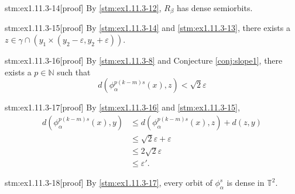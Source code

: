 \begin{stm}{stm:ex1.11.3-14}[proof]
By \ref{stm:ex1.11.3-12}, $R_\beta$ has dense semiorbits.
\end{stm}

\begin{stm}{stm:ex1.11.3-15}[proof]
By \ref{stm:ex1.11.3-14} and \ref{stm:ex1.11.3-13}, there exists a $z \in \gamma \cap (y_1 \times (y_2 - \varepsilon, y_2 + \varepsilon))$.
\end{stm}

\begin{stm}{stm:ex1.11.3-16}[proof]
By \ref{stm:ex1.11.3-8} and Conjecture \ref{conj:slope1}, there exists a $p \in \mathbb{N}$ such that $$d(\phi_\alpha^{p(k-m)s}(x), z) < \sqrt{2} \varepsilon$$
\end{stm}

\begin{stm}{stm:ex1.11.3-17}[proof]
By \ref{stm:ex1.11.3-16} and \ref{stm:ex1.11.3-15},
\begin{align*}
d(\phi_\alpha^{p(k-m)s}(x), y)
&\le d(\phi_\alpha^{p(k-m)s}(x), z) + d(z, y) \\
&\le \sqrt{2} \varepsilon + \varepsilon \\
&\le 2\sqrt{2} \varepsilon \\
&\le \varepsilon'.
\end{align*}
\end{stm}


\begin{stm}{stm:ex1.11.3-18}[proof]
By \ref{stm:ex1.11.3-17}, every orbit of $\phi_\alpha^s$ is dense in $\mathbb{T}^2$.
\end{stm}

